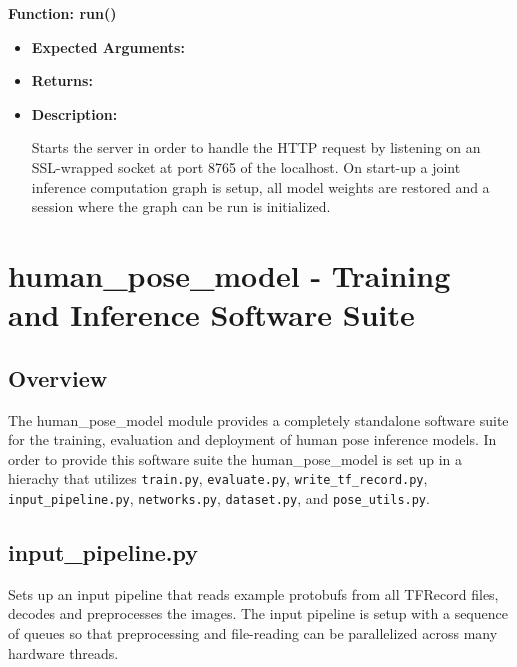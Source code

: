 \documentclass{scrreprt}
\begin{document}
\textbf{Function: run()}
\begin{itemize}
    \item \textbf{Expected Arguments:}

    \item \textbf{Returns:}

    \item \textbf{Description:}

            Starts the server in order to handle the HTTP request by listening
                on an SSL-wrapped socket at port 8765 of the localhost. On
                start-up a joint inference computation graph is setup, all
                model weights are restored and a session where the graph can be
                run is initialized.

\end{itemize}

\section{human\_pose\_model - Training and Inference Software Suite}

\subsection{Overview}

The human\_pose\_model module provides a completely standalone software suite
for the training, evaluation and deployment of human pose inference models. In
order to provide this software suite the human\_pose\_model is set up in a
hierachy that utilizes \verb|train.py|, \verb|evaluate.py|, \verb|write_tf_record.py|,
\verb|input_pipeline.py|, \verb|networks.py|, \verb|dataset.py|, and \verb|pose_utils.py|.

\subsection{input\_pipeline.py}

Sets up an input pipeline that reads example protobufs from all TFRecord files,
decodes and preprocesses the images. The input pipeline is setup with a
sequence of queues so that preprocessing and file-reading can be parallelized
across many hardware threads.
\end{document}
